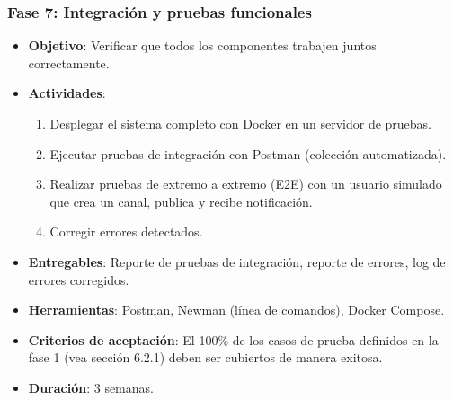\subsubsection{Fase 7: Integración y pruebas funcionales}
\begin{itemize}
    \item \textbf{Objetivo}: Verificar que todos los componentes trabajen juntos correctamente.
    \item \textbf{Actividades}:
        \begin{enumerate}
            \item Desplegar el sistema completo con Docker en un servidor de pruebas.
            \item Ejecutar pruebas de integración con Postman (colección automatizada).
            \item Realizar pruebas de extremo a extremo (E2E) con un usuario simulado que crea un canal, publica y recibe notificación.
            \item Corregir errores detectados.
        \end{enumerate}
    \item \textbf{Entregables}: Reporte de pruebas de integración, reporte de errores, log de errores corregidos.
    \item \textbf{Herramientas}: Postman, Newman (línea de comandos), Docker Compose.
    \item \textbf{Criterios de aceptación}: El 100\% de los casos de prueba definidos en la fase 1 (vea sección 6.2.1) deben ser cubiertos de manera exitosa.
    \item \textbf{Duración}: 3 semanas.
\end{itemize}

